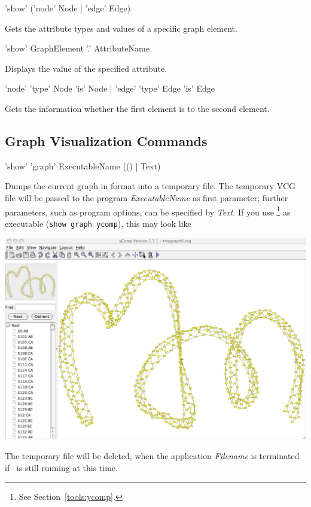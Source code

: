 \begin{rail}
 'show' ('node' Node | 'edge' Edge)
\end{rail}
Gets the attribute types and values of a specific graph element.

\begin{rail}
  'show' GraphElement '.' AttributeName
\end{rail}
Displays the value of the specified attribute.

\begin{rail}
  'node' 'type' Node 'is' Node | 'edge' 'type' Edge 'is' Edge
\end{rail}
Gets the information whether the first element is  to the second element.


\subsection{Graph Visualization Commands}\label{sub:visual}

\begin{rail}
  'show' 'graph' ExecutableName (() | Text)
\end{rail}
Dumps the current graph in  format into a temporary file.
The temporary VCG file will be passed to the program \emph{ExecutableName} as first parameter;
further parameters, such as program options, can be specified by \emph{Text}.
If you use \yComp\footnote{See Section~\ref{tools:ycomp}.} as executable (\texttt{show graph ycomp}), this may look like
\begin{center}
  \includegraphics[width=0.75\linewidth]{fig/showgraph}
\end{center}  
The temporary file will be deleted, when the application \emph{Filename} is terminated if \GrShell\ is still running at this time.

